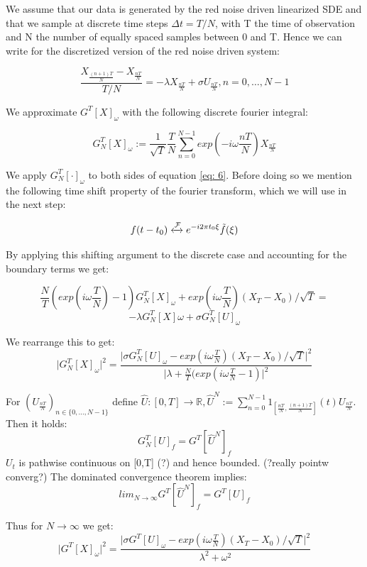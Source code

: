 \documentclass[%
thesis=student,%
coverpage=false,%
titlepage=false,%
headmarks=true, %
german,%
font=libertine, %
math=newpxtx, %
BCOR=5mm,%
coverBCOR=11mm%
]{tumbook}
\begin{document}
We assume that our data is generated by the red noise driven linearized SDE and that we sample at discrete time steps $\Delta t = T/N$, with T the time of observation and N the number of equally spaced samples between 0 and T. Hence we can write for the discretized version of the red noise driven system:

        \begin{equation}  
        \frac{X_{\frac{(n+1)T}{N}}-X_{\frac{nT}{N}}}{T/N} = -\lambda X_{\frac{nT}{N}} + \sigma U_{\frac{nT}{N}}, n = 0, \dots, N-1 \label{eq: 6}
        \end{equation}


We approximate $G^{T}[X]_{\omega}$ with the following discrete fourier integral:

    \[
    G_{N}^{T}[X]_{\omega}:= \frac{1}{\sqrt{T}}\frac{T}{N}\sum_{n=0}^{N-1}exp(-i\omega\frac{nT}{N})X_{\frac{nT}{N}}
    \]


We apply $G_{N}^{T}[\cdot]_{\omega}$ to both sides of equation \ref{eq: 6}. Before doing so we mention the following time shift property of the fourier transform, which we will use in the next step:

\[
f(t-t_{0}) \xleftrightarrow{\mathcal{F}} e^{-i2\pi t_{0}\xi}\Tilde{f}(\xi)
\]

By applying this shifting argument to the discrete case and accounting for the boundary terms we get: 
        
    \[
    \frac{N}{T}(exp(i\omega\frac{T}{N})-1)G_{N}^{T}[X]_{\omega} + exp(i\omega\frac{T}{N})(X_{T}-X_{0})/\sqrt{T} = 
    \]
    \[
     -\lambda G_{N}^{T}[X]\omega + \sigma G_{N}^{T}[U]_{\omega}
    \]


We rearrange this to get:
    \[
    \lvert G_{N}^{T}[X]_{\omega}\rvert ^2 = \frac{\lvert \sigma G_{N}^{T}[U]_{\omega} - exp(i\omega\frac{T}{N})(X_{T}-X_{0})/\sqrt{T}\rvert ^2}{\lvert \lambda + \frac{N}{T}(exp(i\omega\frac{T}{N} - 1)\rvert^2}
    \]

For $(U_{\frac{nT}{N}})_{n \in \{0,...,N-1\}}$ define $\hat{U}:[0,T]\rightarrow\mathbb{R}, \hat{U}^{N} := \sum_{n=0}^{N-1}1_{[\frac{nT}{N},\frac{(n+1)T}{N}]}(t)U_{\frac{nT}{N}}$. Then it holds:
\[
G_{N}^{T}[U]_{f} = G^{T}[\hat{U}^{N}]_{f}
\]
$U_{t}$ is pathwise continuous on [0,T] (?) and hence bounded. (?really pointw converg?) The dominated convergence theorem implies:
\[
lim_{N\rightarrow\infty}G^{T}[\hat{U}^{N}]_{f} = G^{T}[U]_{f}
\]

Thus for $N \rightarrow \infty$ we get:
\[
    \lvert G^{T}[X]_{\omega} \rvert^2 = \frac{\lvert\sigma G^{T}[U]_{\omega} - exp(i\omega\frac{T}{N})(X_{T}-X_{0})/\sqrt{T}\rvert ^2}{\lambda^2 + \omega^2}
\]
\end{document}
